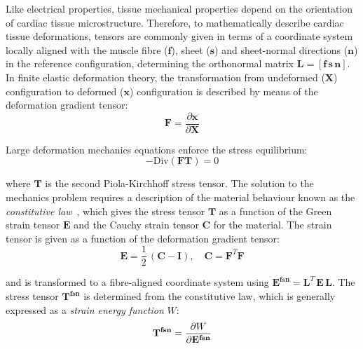 \vspace{0.2cm}
Like electrical properties, tissue mechanical properties depend on the orientation of cardiac tissue microstructure. Therefore, to mathematically describe cardiac tissue deformations, tensors are commonly given in terms of a coordinate system locally aligned with the muscle fibre ($\mathbf{f}$), sheet ($\mathbf{s}$) and sheet-normal directions ($\mathbf{n}$) in the reference configuration, determining the orthonormal matrix $\mathbf{L} = [\mathbf{f}\,\mathbf{s}\,\mathbf{n}]$. In finite elastic deformation theory, the transformation from undeformed ($\mathbf{X}$) configuration to deformed ($\mathbf{x}$) configuration is described by means of the deformation gradient tensor:
%
\begin{equation}
    \mathbf{F} = \frac{\partial \mathbf{x}}{\partial\mathbf{X}}
\end{equation}

\noindent
Large deformation mechanics equations enforce the stress equilibrium:
%
\begin{equation}
    -\text{Div}(\mathbf{F}\mathbf{T}) = 0
\end{equation}

\noindent
where $\mathbf{T}$ is the second Piola-Kirchhoff stress tensor. The solution to the mechanics problem requires a description of the material behaviour known as the \textit{constitutive law}~\cite{BonetWood:2008}, which gives the stress tensor $\mathbf{T}$ as a function of the Green strain tensor $\mathbf{E}$ and the Cauchy strain tensor $\mathbf{C}$ for the material. The strain tensor is given as a function of the deformation gradient tensor:
%
\begin{equation}
    \mathbf{E} = \frac{1}{2}\,(\mathbf{C}-\mathbf{I}),\quad \mathbf{C}=\mathbf{F}^T\mathbf{F}
\end{equation}

\noindent
and is transformed to a fibre-aligned coordinate system using $\mathbf{E^{fsn}}=\mathbf{L}^T\,\mathbf{E}\,\mathbf{L}$. The stress tensor $\mathbf{T^{fsn}}$ is determined from the constitutive law, which is generally expressed as a \textit{strain energy function} $W$:
%
\begin{equation}
    \mathbf{T^{fsn}} = \dfrac{\partial {W}}{\partial {\mathbf{E^{fsn}}}}
\end{equation}


